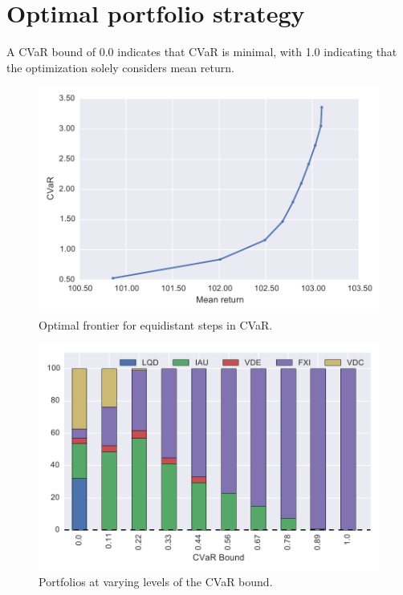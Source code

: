 \section{Optimal portfolio strategy}

A CVaR bound of 0.0 indicates that CVaR is minimal, with 1.0 indicating that the optimization solely considers mean return.


\begin{figure}[tp]
\centering
\includegraphics{../pic/frontier.pdf}
\caption{Optimal frontier for equidistant steps in CVaR.}
\label{fig:scenarioreturn}
\end{figure}

\begin{figure}[tp]
\centering
\includegraphics{../pic/Stake_vs_CVaR.pdf}
\caption{Portfolios at varying levels of the CVaR bound.}
\label{fig:scenarioreturn}
\end{figure}

